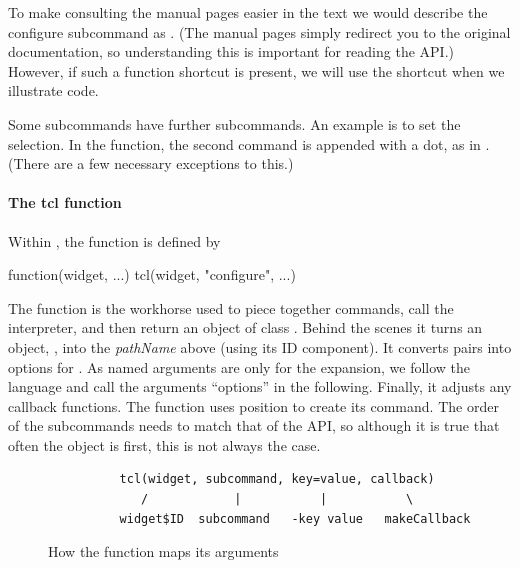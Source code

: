 To make consulting the \TK\/ manual pages easier in the text we would
describe the configure subcommand as
. (The \R\/ manual pages
simply redirect you to the original \TK\/ documentation, so
understanding this is important for reading the API.) However, if such
a function shortcut is present, we will use the shortcut when we
illustrate code. 

Some subcommands have further subcommands. An example
is to set the selection. In the \R\/ function, the second command is
appended with a dot, as in . (There are a few
necessary exceptions to this.)

\paragraph{The tcl function} Within , the  function is defined by

\begin{Sinput}
function(widget, ...) tcl(widget, "configure", ...)
\end{Sinput}

The  function is the workhorse used to piece
together \TCL\/ commands, call the interpreter, and then return an
object of class .  Behind the scenes it turns an \R\/
object, , into the \textit{pathName} above (using its ID
component). It converts \R\/  pairs into  options for \TCL. As named arguments are only for the
 expansion, we follow the \TCL\/ language and call
the arguments ``options'' in the following. Finally, it adjusts any
callback functions. The  function uses position to
create its command. The order of the subcommands needs to match that
of the \TK\/ API, so although it is true that often the \R\/ object is
first, this is not always the case.

\begin{figure}
  \centering
\begin{verbatim}
          tcl(widget, subcommand, key=value, callback)
             /            |           |           \
          widget$ID  subcommand   -key value   makeCallback
\end{verbatim}
  \caption{How the  function maps its arguments}
  \label{fig:tcl-function-map}
\end{figure}






